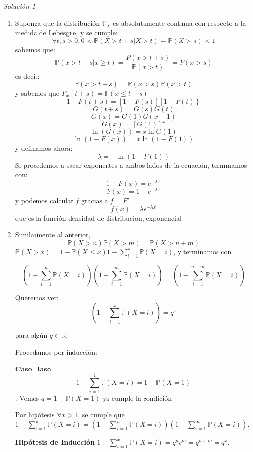 \documentclass[notitlepage]{article}
\theoremstyle{definition}
\theoremstyle{remark}
\newtheorem*{sol}{Solución}
\newcommand{\prob}[1]{\mathbb{P}(#1)}
\newcommand{\lrp}[1]{\left( #1 \right)}
\newcommand{\PP}{\mathbb{P}}
\begin{document}
		\begin{sol}
			\begin{enumerate}
			\item
			Suponga que la distribución $ \mathbb{P}_X $ es absolutamente contínua con respecto a la medida de Lebesgue, y se cumple:
			\[ \forall t,s>0, 0< \mathbb{P}(X>t+s\vert X>t)=\mathbb{P}(X>s)<1  \]
			sabemos que:
			\[ \PP\lrp{x > t + s | x \geq t} = \frac{P(x > t + s)}{\PP(x > t)} = P(x > s) \]
			es decir:
			\[ \PP(x > t + s) = \PP(x > s)\PP(x > t) \]
			y sabemos que $ F_x(t + s) = \PP(x \leq t +s) $
			\[ 1 - F(t + s) = \left\lbrack 1 - F(s) \right\rbrack \left\lbrack 1 - F(t) \right\rbrace  \]
			\[ G(t +s) = G(s)G(t) \]
			\[ G(x) = G(1)G(x-1) \]
			\[ G(x) = \left\lbrack G(1) \right\rbrack^x\]
			\[ \ln(G(x)) = x \ln G(1) \]
			\[ \ln(1-F(x)) = x \ln(1 - F(1)) \]
			y definamos ahora:
			\[ \lambda = - \ln(1 - F(1)) \]
			Si procedemos a sacar exponentes a ambos lados de la ecuación, terminamos con:
			\[ 1- F(x) = e^{-\lambda x} \]
			\[ F(x) = 1 - e^{-\lambda x} \]
			y podemos calcular $ f $ gracias a $ f = F' $
			\[ f(x) = \lambda e^{-\lambda x} \]
			que es la función densidad  de distribucion, exponencial
			\item
			Similarmente al anterior,
			\begin{equation}
			\prob{X>n}\prob{X>m}=\prob{X>n+m} \nonumber
			\end{equation}
			 $ \prob{X>x}=1-\prob{X\leq x} 1-\sum_{i=1}^x \prob{X=i} $, y terminamos con
			
			\begin{equation}
			(1-\sum_{i=1}^n \prob{X=i})(1-\sum_{i=1}^m \prob{X=i})=(1-\sum_{i=1}^{n+m} \prob{X=i}) \nonumber
			\end{equation}
			
			Queremos ver:
			\begin{equation}
			(1-\sum_{i=1}^x \prob{X=i}) = q^x
			\end{equation}
			
			para algún $ q \in \mathbb{R} $.
			
			Procedamos por inducción:
			
			\textbf{Caso Base} \[ 1-\sum_{i=1}^1 \prob{X=i} = 1-\prob{X=1 }\]. Vemos $ q = 1-\prob{X=1} $ ya cumple la condición
			
			Por hipótesis $ \forall x>1  $, se cumple que $\displaystyle 1-\sum_{i=1}^x \prob{X = i} = (1-\sum_{i=1}^n \prob{X=i})(1-\sum_{i=1}^m \prob{X=i}) $. 
			
			\textbf{Hipótesis de Inducción}  $ \displaystyle 1-\sum_{i=1}^x \prob{X = i} = q^nq^m=q^{n+m}= q^x $.
			

\end{enumerate}
\end{sol}
\end{document}
